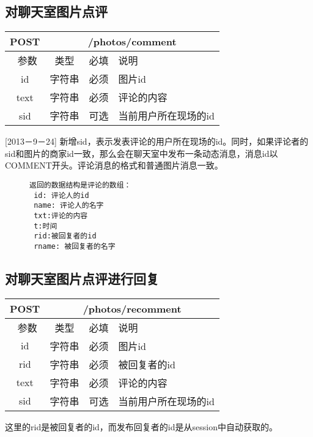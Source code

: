 \subsection{对聊天室图片点评}

\begin{table}[H]
   \begin{center}
\begin{tabular}{|c|c|c|p{12cm}|}
\hline
POST & \multicolumn{3}{|c|}{/photos/comment} \\
\hline\hline
 \  参数  & 类型 & 必填 &  说明  \\
  \hline
 id  & 字符串 & 必须 & 图片id\\
   \hline
 text  & 字符串 & 必须 & 评论的内容\\
  \hline
 sid  & 字符串 & 可选 & 当前用户所在现场的id\\ 
\hline
\end{tabular}
   \end{center}
\end{table}

[2013－9－24] 新增sid，表示发表评论的用户所在现场的id。同时，如果评论者的sid和图片的商家id一致，那么会在聊天室中发布一条动态消息，消息id以COMMENT开头。评论消息的格式和普通图片消息一致。

\begin{figure}[H]
\begin{verbatim}
返回的数据结构是评论的数组：
 id: 评论人的id
 name: 评论人的名字
 txt:评论的内容
 t:时间
 rid:被回复者的id
 rname: 被回复者的名字
\end{verbatim}
\end{figure}

\subsection{对聊天室图片点评进行回复}

\begin{table}[H]
   \begin{center}
\begin{tabular}{|c|c|c|p{12cm}|}
\hline
POST & \multicolumn{3}{|c|}{/photos/recomment} \\
\hline\hline
 \  参数  & 类型 & 必填 &  说明  \\
  \hline
 id  & 字符串 & 必须 & 图片id\\
 \hline
 rid  & 字符串 & 必须 & 被回复者的id\\
   \hline
 text  & 字符串 & 必须 & 评论的内容\\
  \hline
 sid  & 字符串 & 可选 & 当前用户所在现场的id\\  
\hline
\end{tabular}
   \end{center}
\end{table}
这里的rid是被回复者的id，而发布回复者的id是从session中自动获取的。


